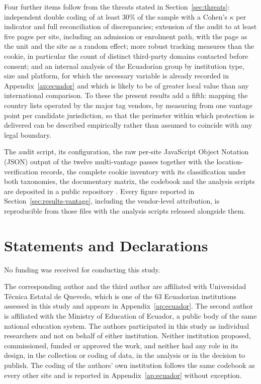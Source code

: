 \documentclass[pdflatex,sn-basic,Numbered,iicol]{sn-jnl}
\theoremstyle{thmstyleone}
\theoremstyle{thmstyletwo}
\theoremstyle{thmstylethree}
\begin{document}
Four further items follow from the threats stated in Section~\ref{sec:threats}: independent double coding of at least 30\% of the sample with a Cohen's $\kappa$ per indicator and full reconciliation of discrepancies; extension of the audit to at least five pages per site, including an admission or enrolment path, with the page as the unit and the site as a random effect; more robust tracking measures than the cookie, in particular the count of distinct third-party domains contacted before consent; and an internal analysis of the Ecuadorian group by institution type, size and platform, for which the necessary variable is already recorded in Appendix~\ref{ap:ecuador} and which is likely to be of greater local value than any international comparison. To these the present results add a fifth: mapping the country lists operated by the major tag vendors, by measuring from one vantage point per candidate jurisdiction, so that the perimeter within which protection is delivered can be described empirically rather than assumed to coincide with any legal boundary.

\backmatter

The audit script, its configuration, the raw per-site JavaScript Object Notation (JSON) output of the twelve multi-vantage passes together with the location-verification records, the complete cookie inventory with its classification under both taxonomies, the documentary matrix, the codebook and the analysis scripts are deposited in a public repository \citep{deposito2026}. Every figure reported in Section~\ref{sec:results-vantage}, including the vendor-level attribution, is reproducible from those files with the analysis scripts released alongside them.

\section*{Statements and Declarations}

No funding was received for conducting this study.

The corresponding author and the third author are affiliated with Universidad T\'ecnica Estatal de Quevedo, which is one of the 63 Ecuadorian institutions assessed in this study and appears in Appendix~\ref{ap:ecuador}. The second author is affiliated with the Ministry of Education of Ecuador, a public body of the same national education system. The authors participated in this study as individual researchers and not on behalf of either institution. Neither institution proposed, commissioned, funded or approved the work, and neither had any role in its design, in the collection or coding of data, in the analysis or in the decision to publish. The coding of the authors' own institution follows the same codebook as every other site and is reported in Appendix~\ref{ap:ecuador} without exception.
\end{document}
